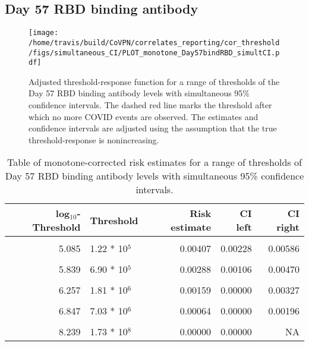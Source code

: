 \documentclass[]{book}
\theoremstyle{definition}
\theoremstyle{definition}
\theoremstyle{definition}
\newcommand{\1}{\mathbbm{1}}
\begin{document}
\clearpage

\clearpage

\clearpage

\hypertarget{day-57-rbd-binding-antibody-3}{%
\subsection{Day 57 RBD binding antibody}\label{day-57-rbd-binding-antibody-3}}

\begin{figure}[H]
\centering
\texttt{[image: /home/travis/build/CoVPN/correlates\_reporting/cor\_threshold/figs/simultaneous\_CI/PLOT\_monotone\_Day57bindRBD\_simultCI.pdf]}
\caption{Adjusted threshold-response function for a range of thresholds of the
  Day 57 RBD binding antibody levels with simultaneous 95\% confidence intervals. The dashed red line marks the threshold after which no more COVID events are observed. The estimates and confidence intervals are adjusted using the assumption that the true threshold-response is nonincreasing.}
\end{figure}
\begin{table}[!h]

\caption{\label{tab:unnamed-chunk-397}Table of monotone-corrected risk estimates for a range of thresholds of Day 57 RBD binding antibody levels with simultaneous 95\% confidence intervals.}
\centering
\begin{tabular}[t]{rlrrr}
\toprule
log$_{10}$-Threshold & Threshold & Risk estimate & CI left & CI right\\
\midrule
\cellcolor{gray!6}{4.062} & \cellcolor{gray!6}{1.15 * 10$^4$} & \cellcolor{gray!6}{0.00490} & \cellcolor{gray!6}{0.00302} & \cellcolor{gray!6}{0.00677}\\
5.085 & 1.22 * 10$^5$ & 0.00407 & 0.00228 & 0.00586\\
\cellcolor{gray!6}{5.507} & \cellcolor{gray!6}{3.21 * 10$^5$} & \cellcolor{gray!6}{0.00377} & \cellcolor{gray!6}{0.00188} & \cellcolor{gray!6}{0.00565}\\
5.839 & 6.90 * 10$^5$ & 0.00288 & 0.00106 & 0.00470\\
\cellcolor{gray!6}{6.048} & \cellcolor{gray!6}{1.12 * 10$^6$} & \cellcolor{gray!6}{0.00238} & \cellcolor{gray!6}{0.00056} & \cellcolor{gray!6}{0.00420}\\
6.257 & 1.81 * 10$^6$ & 0.00159 & 0.00000 & 0.00327\\
\cellcolor{gray!6}{6.499} & \cellcolor{gray!6}{3.16 * 10$^6$} & \cellcolor{gray!6}{0.00124} & \cellcolor{gray!6}{0.00000} & \cellcolor{gray!6}{0.00304}\\
6.847 & 7.03 * 10$^6$ & 0.00064 & 0.00000 & 0.00196\\
\cellcolor{gray!6}{7.181} & \cellcolor{gray!6}{1.52 * 10$^7$} & \cellcolor{gray!6}{0.00064} & \cellcolor{gray!6}{0.00000} & \cellcolor{gray!6}{0.00341}\\
8.239 & 1.73 * 10$^8$ & 0.00000 & 0.00000 & NA\\
\bottomrule
\end{tabular}
\end{table}
\end{document}
